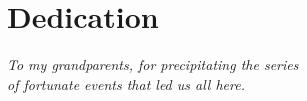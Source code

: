 \chapter{Dedication}

\begin{center}
    \vspace*{\fill}
    \large %
    \textit{To my grandparents, for precipitating the series}\\
    \textit{of fortunate events that led us all here.}
    \vspace*{\fill}
\end{center}